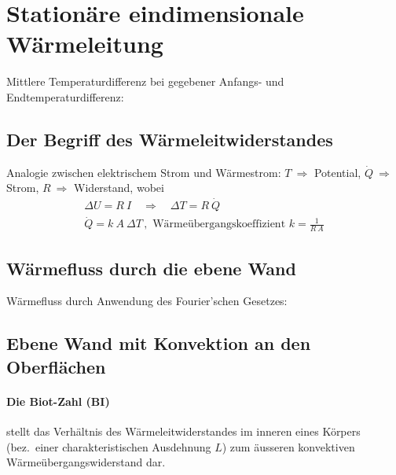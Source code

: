 \section{Stationäre eindimensionale Wärmeleitung} %
	Mittlere Temperaturdifferenz bei gegebener Anfangs- und Endtemperaturdifferenz:
	\subsection{Der Begriff des Wärmeleitwiderstandes} %
		Analogie zwischen elektrischem Strom und Wärmestrom: $T \ \Rightarrow$ Potential, $\dot Q \ \Rightarrow$ Strom, $R \ \Rightarrow$ Widerstand, wobei
		\begin{gather*}
			\Delta U = R \: I \quad \Rightarrow \quad \Delta T = R \: \dot Q \\
			\dot Q = k \: A \: \Delta T \,, \text{ Wärmeübergangskoeffizient } k = \frac{1}{R\: A}
		\end{gather*}

	\subsection{Wärmefluss durch die ebene Wand} %

		Wärmefluss durch Anwendung des Fourier'schen Gesetzes:

	\subsection{Ebene Wand mit Konvektion an den Oberflächen} %
		\paragraph{Die Biot-Zahl (BI)} %
			stellt das Verhältnis des Wär\-me\-leit\-wi\-der\-stan\-des im inneren eines Körpers (bez.~einer charakteristischen Ausdehnung $L$) zum äusseren konvektiven Wärme\-über\-gangswiderstand dar.


